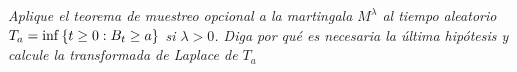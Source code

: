 \emph{
    Aplique el teorema de muestreo opcional a la martingala 
    $M^\lambda $ al tiempo aleatorio $T_a=\inf\left\{ t\geq 0:B_t\geq a\right\} $ 
    si $\lambda>0$. Diga por qu\'e es necesaria la \'ultima 
    hip\'otesis y calcule la transformada de Laplace de $T_a$
}

\afterstatement\pn